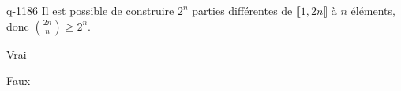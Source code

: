 \begin{truefalse}{q-1186}
Il est possible de construire $2^n$ parties différentes de $\llbracket 1, 2n \rrbracket$ à $n$ éléments, donc $\binom {2n}n \geq 2^n$.
\item* Vrai
\item Faux
\end{truefalse}

